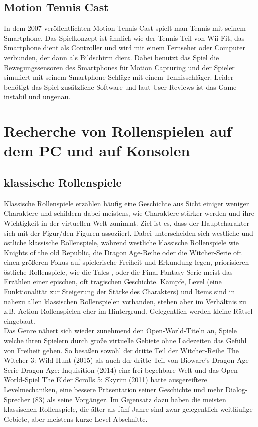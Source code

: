 \documentclass[extern,palatino]{cgBA}
\begin{document}
\subsection{Motion Tennis Cast}
In dem 2007 veröffentlichten Motion Tennis Cast spielt man Tennis mit seinem Smartphone. Das Spielkonzept ist ähnlich wie der Tennis-Teil von Wii Fit, das Smartphone dient als Controller und wird mit einem Fernseher oder Computer verbunden, der dann als Bildschirm dient. Dabei benutzt das Spiel die Bewegungssensoren des Smartphones für Motion Capturing und der Spieler simuliert mit seinem Smartphone Schläge mit einem Tennisschläger. Leider benötigt das Spiel zusätzliche Software und laut User-Reviews ist das Game instabil und ungenau.
\newpage

\section{Recherche von Rollenspielen auf dem PC und auf Konsolen}

\subsection{klassische Rollenspiele}
Klassische Rollenspiele erzählen häufig eine Geschichte aus Sicht einiger weniger Charaktere und schildern dabei meistens, wie Charaktere stärker werden und ihre Wichtigkeit in der virtuellen Welt zunimmt. Ziel ist es, dass der Hauptcharakter sich mit der Figur/den Figuren assoziiert. Dabei unterscheiden sich westliche und östliche klassische Rollenspiele, während westliche klassische Rollenspiele wie Knights of the old Republic, die Dragon Age-Reihe oder die Witcher-Serie oft einen größeren Fokus auf spielerische Freiheit und Erkundung legen, priorisieren östliche Rollenspiele, wie die Tales-, oder die Final Fantasy-Serie meist das Erzählen einer epischen, oft tragischen Geschichte.
Kämpfe, Level (eine Funktionalität zur Steigerung der Stärke des Charakters) und Items sind in nahezu allen klassischen Rollenspielen vorhanden, stehen aber im Verhältnis zu z.B. Action-Rollenspielen eher im Hintergrund. Gelegentlich werden kleine Rätsel eingebaut.
\\Das Genre nähert sich wieder zunehmend den Open-World-Titeln an, Spiele welche ihren Spielern durch große virtuelle Gebiete ohne Ladezeiten das Gefühl von Freiheit geben. So besaßen sowohl der dritte Teil der Witcher-Reihe The Witcher 3: Wild Hunt (2015) als auch der dritte Teil von Bioware's Dragon Age Serie Dragon Age: Inquisition (2014) eine frei begehbare Welt und das Open-World-Spiel The Elder Scrolls 5: Skyrim (2011) hatte ausgereiftere Levelmechaniken, eine bessere Präsentation seiner Geschichte und mehr Dialog-Sprecher (83) als seine Vorgänger. Im Gegensatz dazu haben die meisten klassischen Rollenspiele, die älter als fünf Jahre sind zwar gelegentlich weitläufige Gebiete, aber meistens kurze Level-Abschnitte. %
\end{document}
